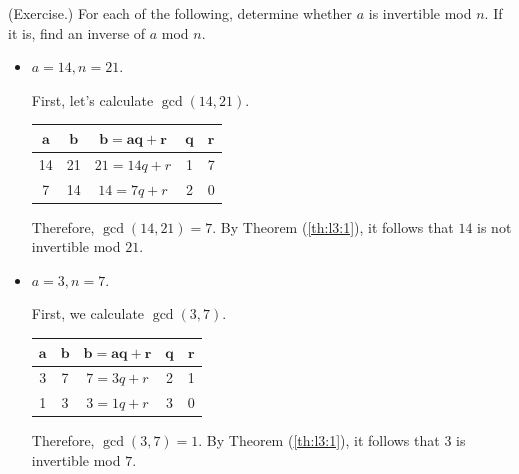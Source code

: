 \documentclass[letterpaper]{article}
\begin{document}
\begin{mdframed}
    (Exercise.) For each of the following, determine whether $a$ is invertible mod $n$. If it is, find an inverse of $a$ mod $n$. 
    \begin{itemize}
        \item $a = 14, n = 21$.
        \begin{mdframed}
            First, let's calculate $\gcd(14, 21)$. 
            \begin{center}
                \begin{tabular}{|c|c|c|c|c|}
                    \hline 
                    $\mathbf{a}$ & $\mathbf{b}$ & $\mathbf{b = aq + r}$ & $\mathbf{q}$ & $\mathbf{r}$ \\ 
                    \hline 
                    14 & 21 & $21 = 14q + r$ & 1 & 7 \\ 
                    7 & 14 & $14 = 7q + r$ & 2 & 0 \\ 
                    \hline 
                \end{tabular}
            \end{center}
            Therefore, $\gcd(14, 21) = 7$. By Theorem (\ref{th:l3:1}), it follows that $14$ is not invertible mod $21$. 
        \end{mdframed}

        \item $a = 3, n = 7$.
        \begin{mdframed}
            First, we calculate $\gcd(3, 7)$. 
            \begin{center}
                \begin{tabular}{|c|c|c|c|c|}
                    \hline 
                    $\mathbf{a}$ & $\mathbf{b}$ & $\mathbf{b = aq + r}$ & $\mathbf{q}$ & $\mathbf{r}$ \\ 
                    \hline 
                    3 & 7 & $7 = 3q + r$ & 2 & 1 \\ 
                    1 & 3 & $3 = 1q + r$ & 3 & 0 \\ 
                    \hline 
                \end{tabular}
            \end{center}
            Therefore, $\gcd(3, 7) = 1$. By Theorem (\ref{th:l3:1}), it follows that $3$ is invertible mod $7$.

            \bigskip 


\end{mdframed}
\end{itemize}
\end{mdframed}
\end{document}
